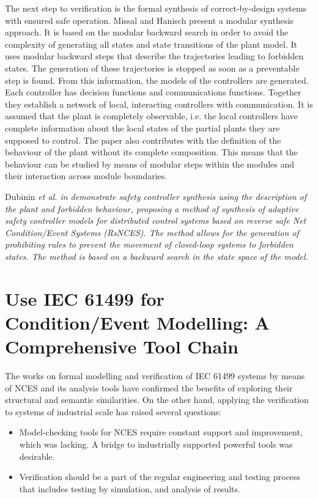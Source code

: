 \documentclass[runningheads]{llncs}
\newcommand{\etal}{\it et al. \normalfont}
\begin{document}
 The next step to verification is the formal synthesis of correct-by-design systems with ensured safe operation. Missal and Hanisch \cite{missal2008modularA,missal2008modularB} present a modular synthesis approach. It is based on the modular backward search in order to avoid the complexity of generating all states and state transitions of the plant model.
It uses modular backward steps that describe the trajectories leading to forbidden states. The generation of these trajectories is stopped as soon as a preventable step is found. From this information, the models of the controllers are generated. 
Each controller has decision functions and communications functions. Together they establish a network of local, interacting controllers with communication. It is assumed that the plant is completely observable, i.e. the local controllers have complete information about the local states of the partial plants they are supposed to control. 
The paper also contributes with the definition of the behaviour of the plant without its complete composition. This means that the behaviour can be studied by means of modular steps within the modules and their interaction across module boundaries.

Dubinin \etal in \cite{dubinin2015synthesis} demonstrate safety controller synthesis  using the description of the plant and forbidden behaviour, proposing a method of synthesis of adaptive safety controller models for distributed control systems based on reverse safe Net Condition/Event Systems (RsNCES). The method allows for the generation of prohibiting rules to prevent the movement of closed-loop systems to forbidden states. The method is based on a backward search in the state space of the model.

\section{Use IEC 61499 for Condition/Event Modelling: A Comprehensive Tool Chain} \label{sec:framework}


The works on formal modelling and verification of IEC 61499 systems by means of NCES and its analysis tools have confirmed the benefits of exploring their structural and semantic similarities. On the other hand, applying the verification to systems of industrial scale has raised several questions:
\begin{itemize}
\item Model-checking tools for NCES require constant support and improvement, which was lacking. A bridge to industrially supported powerful tools was desirable.
\item Verification should be a part of the regular engineering and testing process that includes testing by simulation, and analysis of results. 
\end{itemize}
 
\end{document}

